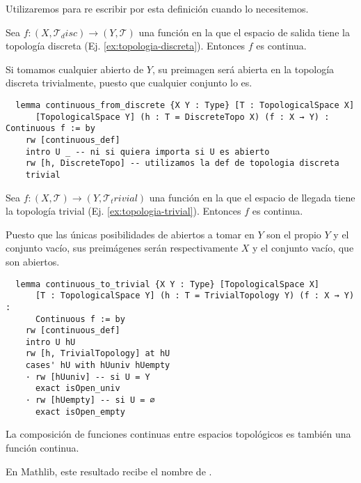 Utilizaremos  para re escribir  por esta definición cuando lo necesitemos.

\begin{example}
  Sea $f : (X, \mathcal{T}_disc) \to (Y, \mathcal{T})$ una función en la que el espacio de salida tiene la topología discreta (Ej. \ref{ex:topologia-discreta}). Entonces $f$ es continua.

  Si tomamos cualquier abierto de $Y$, su preimagen será abierta en la topología discreta trivialmente, puesto que cualquier conjunto lo es.
\end{example}

\begin{lstlisting}
  lemma continuous_from_discrete {X Y : Type} [T : TopologicalSpace X]
      [TopologicalSpace Y] (h : T = DiscreteTopo X) (f : X → Y) : Continuous f := by
    rw [continuous_def]
    intro U _ -- ni si quiera importa si U es abierto
    rw [h, DiscreteTopo] -- utilizamos la def de topologia discreta
    trivial
\end{lstlisting}

\begin{example}
  Sea $f : (X, \mathcal{T}) \to (Y, \mathcal{T}_trivial)$ una función en la que el espacio de llegada tiene la topología trivial (Ej. \ref{ex:topologia-trivial}). Entonces $f$ es continua.

  Puesto que las únicas posibilidades de abiertos a tomar en $Y$ son el propio $Y$ y el conjunto vacío, sus preimágenes serán respectivamente $X$ y el conjunto vacío, que son abiertos.
\end{example}

\begin{lstlisting}
  lemma continuous_to_trivial {X Y : Type} [TopologicalSpace X]
      [T : TopologicalSpace Y] (h : T = TrivialTopology Y) (f : X → Y) :
      Continuous f := by
    rw [continuous_def]
    intro U hU
    rw [h, TrivialTopology] at hU
    cases' hU with hUuniv hUempty
    · rw [hUuniv] -- si U = Y
      exact isOpen_univ
    · rw [hUempty] -- si U = ∅
      exact isOpen_empty
\end{lstlisting}

\begin{proposition}
  La composición de funciones continuas entre espacios topológicos es también una función continua.
\end{proposition}

En Mathlib, este resultado recibe el nombre de .

